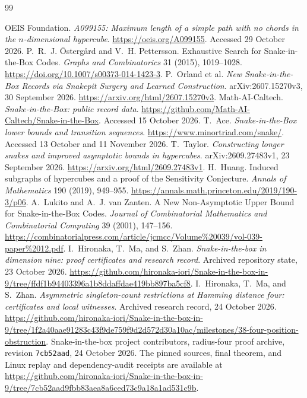 \documentclass[11pt,a4paper]{article}
\theoremstyle{definition}
\theoremstyle{remark}
\begin{document}
\clearpage
{}
\begin{thebibliography}{99}\raggedright
{} OEIS Foundation. \emph{A099155: Maximum length of a simple path with no chords in the $n$-dimensional hypercube}. \url{https://oeis.org/A099155}. Accessed 29 October 2026.
 P.~R.~J. Östergård and V.~H. Pettersson. Exhaustive Search for Snake-in-the-Box Codes. \emph{Graphs and Combinatorics} 31 (2015), 1019--1028. \url{https://doi.org/10.1007/s00373-014-1423-3}.
 P.~Orland et al. \emph{New Snake-in-the-Box Records via Snakepit Surgery and Learned Construction}. arXiv:2607.15270v3, 30 September 2026. \url{https://arxiv.org/html/2607.15270v3}.
 Math-AI-Caltech. \emph{Snake-in-the-Box: public record data}. \url{https://github.com/Math-AI-Caltech/Snake-in-the-Box}. Accessed 15 October 2026.
 T.~Ace. \emph{Snake-in-the-Box lower bounds and transition sequences}. \url{https://www.minortriad.com/snake/}. Accessed 13 October and 11 November 2026.
 T.~Taylor. \emph{Constructing longer snakes and improved asymptotic bounds in hypercubes}. arXiv:2609.27483v1, 23 September 2026. \url{https://arxiv.org/html/2609.27483v1}.
 H.~Huang. Induced subgraphs of hypercubes and a proof of the Sensitivity Conjecture. \emph{Annals of Mathematics} 190 (2019), 949--955. \url{https://annals.math.princeton.edu/2019/190-3/p06}.
 A.~Lukito and A.~J. van Zanten. A New Non-Asymptotic Upper Bound for Snake-in-the-Box Codes. \emph{Journal of Combinatorial Mathematics and Combinatorial Computing} 39 (2001), 147--156. \url{https://combinatorialpress.com/article/jcmcc/Volume%20039/vol-039-paper%2012.pdf}.
 I.~Hironaka, T.~Ma, and S.~Zhan. \emph{Snake-in-the-box in dimension nine: proof certificates and research record}. Archived repository state, 23 October 2026. \url{https://github.com/hironaka-iori/Snake-in-the-box-in-9/tree/ffdf1b94403396a1b8ddaffdae419bb897ba5cf8}.
 I.~Hironaka, T.~Ma, and S.~Zhan. \emph{Asymmetric singleton-count restrictions at Hamming distance four: certificates and local witnesses}. Archived research record, 24 October 2026. \url{https://github.com/hironaka-iori/Snake-in-the-box-in-9/tree/1f2a40aae91283c43f9de759f9d2d572d30a10ac/milestones/38-four-position-obstruction}.
Snake-in-the-box project contributors, radius-four proof archive, revision \texttt{7cb52aad}, 24 October 2026. The pinned sources, final theorem, and Linux replay and dependency-audit receipts are available at
\url{https://github.com/hironaka-iori/Snake-in-the-box-in-9/tree/7cb52aad9fbb83aea8a6ced73c9a18a1ad531c9b}.


\end{thebibliography}
\end{document}
